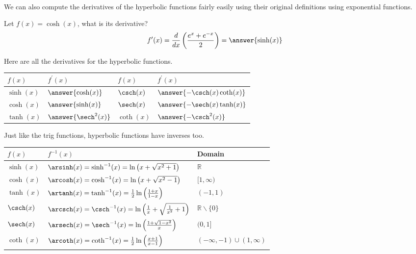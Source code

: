 \documentclass{ximera}
\begin{document}
We can also compute the derivatives of the hyperbolic functions fairly easily using their original definitions using exponential functions.

\begin{example}\label{example:9-2}
Let $f(x)=\cosh (x)$, what is its derivative?
\[
f^{\prime}(x)=\frac{d}{dx}\left(\frac{e^{x}+e^{-x}}{2}\right)=\answer{\sinh(x)}
\]
\end{example}

Here are all the derivatives for the hyperbolic functions.

\begin{center}
\begin{tabular}[t]{|l|l|l|l|}
\hline
$f(x)$ & $f^{\prime}(x)$ & $f(x)$ & $f^{\prime}(x)$ \\
\hline
$\sinh (x)$ & $\answer{\cosh(x)}$ & $\csch(x)$ & $\answer{-\csch(x)\coth(x)}$ \\
\hline
$\cosh (x)$ & $\answer{\sinh(x)}$ & $\sech(x)$ & $\answer{-\sech(x)\tanh(x)}$ \\
\hline
$\tanh (x)$ & $\answer{\sech^{2}(x)}$ & $\coth(x)$ & $\answer{-\csch^{2}(x)}$ \\
\hline
\end{tabular}
\end{center}

Just like the trig functions, hyperbolic functions have inverses too.

\begin{center}
\begin{tabular}[t]{|l|l|l|}
\hline
$f(x)$ & $f^{-1}(x)$ & Domain \\
\hline
$\sinh (x)$ & $\arsinh(x)=\sinh ^{-1}(x)=\ln \left(x+\sqrt{x^{2}+1}\right)$ & $\mathbb{R}$ \\
\hline
$\cosh (x)$ & $\arcosh(x)=\cosh ^{-1}(x)=\ln \left(x+\sqrt{x^{2}-1}\right)$ & $[1, \infty)$ \\
\hline
$\tanh (x)$ & $\artanh(x)=\tanh ^{-1}(x)=\frac{1}{2} \ln \left(\frac{1+x}{1-x}\right)$ & $(-1, 1)$ \\
\hline
$\csch(x)$ & $\arcsch(x)=\csch^{-1}(x)=\ln \left(\frac{1}{x}+\sqrt{\frac{1}{x^{2}}+1}\right)$ & $\mathbb{R} \backslash\{0\}$ \\
\hline
$\sech(x)$ & $\arsech(x)=\sech^{-1}(x)=\ln \left(\frac{1+\sqrt{1-x^{2}}}{x}\right)$ & $(0,1]$ \\
\hline
$\coth(x)$ & $\arcoth(x)=\coth^{-1}(x)=\frac{1}{2} \ln \left(\frac{x+1}{x-1}\right)$ & $(-\infty,-1) \cup(1, \infty)$ \\
\hline
\end{tabular}
\end{center}
\end{document}
